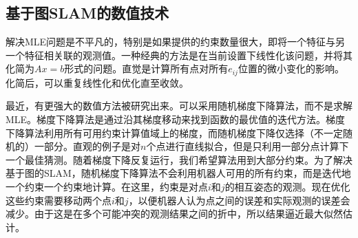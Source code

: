 \subsection{基于图SLAM的数值技术}


解决MLE问题是不平凡的，特别是如果提供的约束数量很大，即将一个特征与另一个特征相关联的观测值。一种经典的方法是在当前设置下线性化该问题，并将其化简为$ Ax = b $形式的问题。直觉是计算所有点对所有$ e_{ij} $位置的微小变化的影响。 化简后，可以重复线性化和优化直至收敛。


最近，有更强大的数值方法被研究出来。可以采用随机梯度下降算法，而不是求解MLE。梯度下降算法是通过沿其梯度移动来找到函数的最优值的迭代方法。梯度下降算法利用所有可用约束计算值域上的梯度，而随机梯度下降仅选择（不一定随机的）一部分。直观的例子是对$ n $个点进行直线拟合，但是只利用一部分点计算下一个最佳猜测。随着梯度下降反复运行，我们希望算法用到大部分约束。为了解决基于图的SLAM，随机梯度下降算法不会利用机器人可用的所有约束，而是迭代地一个约束一个约束地计算。在这里，约束是对点$ i $和$ j $的相互姿态的观测。现在优化这些约束需要移动两个点$ i $和$ j $，以便机器人认为点之间的误差和实际观测的误差会减少。由于这是在多个可能冲突的观测结果之间的折中，所以结果逼近最大似然估计。

